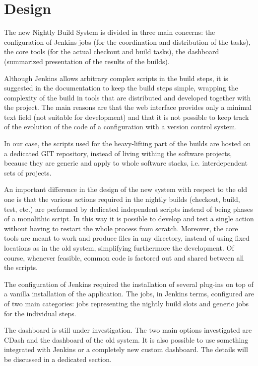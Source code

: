 \section{Design}
\label{sec:Design}
The new Nightly Build System is divided in three main concerns: the
configuration of Jenkins jobs (for the coordination and distribution of the
tasks), the core tools (for the actual checkout and build tasks), the dashboard
(summarized presentation of the results of the builds).

Although Jenkins allows arbitrary complex scripts in the build steps, it is
suggested in the documentation to keep the build steps simple, wrapping the
complexity of the build in tools that are distributed and developed together
with the project.  The main reasons are that the web interface provides only a
minimal text field (not suitable for development) and that it is not possible to
keep track of the evolution of the code of a configuration with a version
control system.

In our case, the scripts used for the heavy-lifting part of the builds are
hosted on a dedicated GIT\cite{GIT} repository, instead of living withing the
software projects, because they are generic and apply to whole software stacks,
i.e. interdependent sets of projects.

An important difference in the design of the new system with respect to the old
one is that the various actions required in the nightly builds (checkout, build,
test, etc.) are performed by dedicated independent scripts instead of being
phases of a monolithic script.  In this way it is possible to develop and test a
single action without having to restart the whole process from scratch.
Moreover, the core tools are meant to work and produce files in any directory,
instead of using fixed locations as in the old system, simplifying furthermore
the development. Of course, whenever feasible, common code is factored out and
shared between all the scripts.

The configuration of Jenkins required the installation of several plug-ins on
top of a vanilla installation of the application.  The jobs, in Jenkins terms,
configured are of two main categories: jobs representing the nightly build slots
and generic jobs for the individual steps.

The dashboard is still under investigation.  The two main options investigated
are CDash\cite{CDash} and the dashboard of the old system.  It is also possible
to use something integrated with Jenkins or a completely new custom dashboard.
The details will be discussed in a dedicated section.
